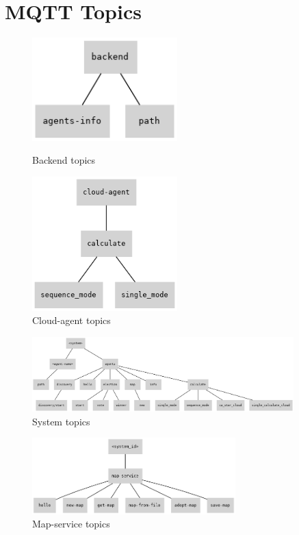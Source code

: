 \chapter{MQTT Topics}
\label{sec:app_02}

\begin{figure}[H]
\centering
\begin{minipage}{0.5\textwidth}
    \centering
    \includegraphics[width=0.5\textwidth]{pictures/topic_backend.png}
    \caption{Backend topics}
    \label{fig:topics_backend}
\end{minipage}%
\begin{minipage}{0.5\textwidth}
    \centering
    \includegraphics[width=0.5\textwidth]{pictures/topic_cloud-agent.png}
    \caption{Cloud-agent topics}
    \label{fig:topics_cloud_agent}
\end{minipage}
\end{figure}


\begin{figure}[H]
    \centering
    \includegraphics[width=0.9\textwidth]{pictures/topic_system_id.png}
    \caption{System topics}
    \label{fig:topics_system_id}
\end{figure}

\begin{figure}[H]
    \centering
    \includegraphics[width=0.7\textwidth]{pictures/topic_map-service.png}
    \caption{Map-service topics}
    \label{fig:topics_map_service}
\end{figure}
